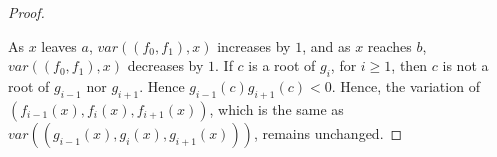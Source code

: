 \documentclass[12pt]{amsart}
\theoremstyle{definition}
\begin{document}
\begin{proof}
\begin{table}[H]
\begin{subtable}{.3\linewidth}
\end{subtable}%
\begin{subtable}{.3\linewidth}
\end{subtable}
\end{table}
\begin{table}[h]
\begin{subtable}{.3\linewidth}
\end{subtable}%
\begin{subtable}{.3\linewidth}
\end{subtable}
\end{table}

As $x$ leaves $a$, $var((f_{0},f_{1}),x)$ increases by $1$, and as $x$ reaches $b$, $var((f_{0},f_{1}),x)$ decreases by $1$. If $c$ is a root of $g_{i}$, for $i\geq 1$, then $c$ is not a root of $g_{i-1}$ nor $g_{i+1}$. Hence $g_{i-1}(c)g_{i+1}(c)<0$. Hence, the variation of $(f_{i-1}(x),f_{i}(x),f_{i+1}(x))$, which is the same as $var((g_{i-1}(x),g_{i}(x),g_{i+1}(x)))$, remains unchanged. \end{proof}
\end{document}
